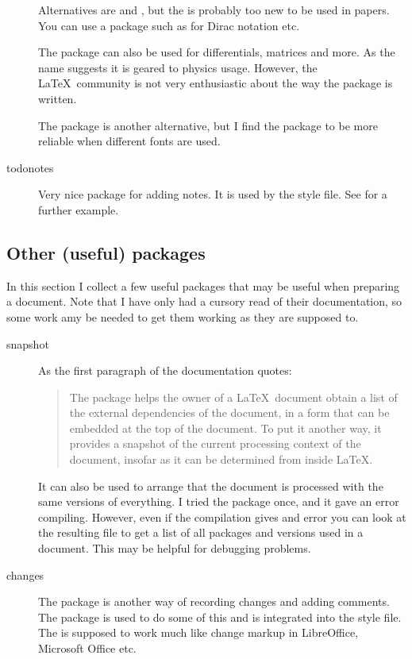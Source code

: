 \begin{description}
  Alternatives are  and ,
  but the  is probably too new to be used in papers.
  You can use a package such as  for Dirac notation etc.

  The package  can also be used for differentials, matrices and more.
  As the name suggests it is geared to physics usage.
  However, the \LaTeX\ community is not very enthusiastic about the way the package is written.
  
  The  package is another alternative,
  but I find the  package to be more reliable when different fonts are used.

  \item[todonotes] Very nice package for adding notes.
  It is used by the  style file.
  See  for a further example.
\end{description}


\subsection{Other (useful) packages}

In this section I collect a few useful packages that may be useful when preparing a document.
Note that I have only had a cursory read of their documentation,
so some work amy be needed to get them working as they are supposed to.
\begin{description}
  \item[snapshot] As the first paragraph of the documentation quotes:
    \begin{quotation}
      The  package helps the owner of a \LaTeX\ document obtain a list of the external dependencies of the document,
      in a form that can be embedded at the top of the document.
      To put it another way, it provides a snapshot of the current processing context of the document,
      insofar as it can be determined from inside \LaTeX.
  \end{quotation}
  It can also be used to arrange that the document is processed with the same versions of everything.
  I tried the package once, and it gave an error compiling.
  However, even if the compilation gives and error
  you can look at the resulting  file to get a list of all packages and versions used in a document.
  This may be helpful for debugging problems.

  \item[changes] The  package is another way of recording changes and adding comments.
    The  package is used to do some of this and is integrated into the  style file.
    The  is supposed to work much like change markup in LibreOffice, Microsoft Office etc.
\end{description}


